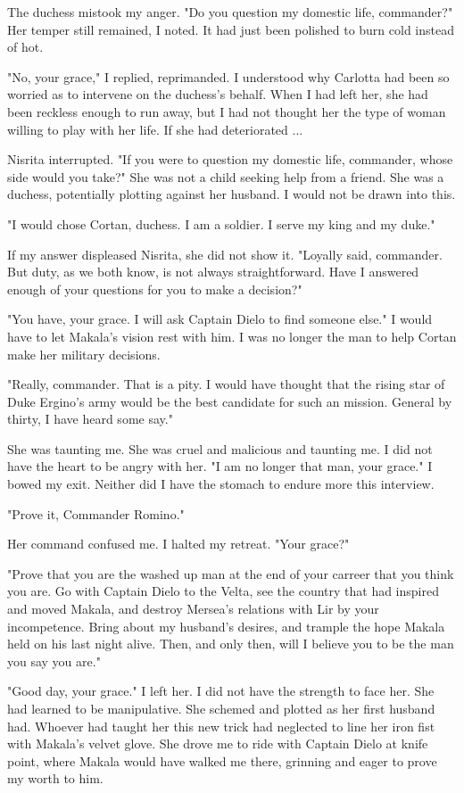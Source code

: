 \documentclass{article}
\begin{document}
The duchess mistook my anger. "Do you question my domestic life, commander?" Her temper still remained, I noted. It had just been polished to burn cold instead of hot.

"No, your grace," I replied, reprimanded. I understood why Carlotta had been so worried as to intervene on the duchess's behalf. When I had left her, she had been reckless enough to run away, but I had not thought her the type of woman willing to play with her life. If she had deteriorated ...

Nisrita interrupted. "If you were to question my domestic life, commander, whose side would you take?" She was not a child seeking help from a friend. She was a duchess, potentially plotting against her husband. I would not be drawn into this.

"I would chose Cortan, duchess. I am a soldier. I serve my king and my duke."

If my answer displeased Nisrita, she did not show it. "Loyally said, commander. But duty, as we both know, is not always straightforward. Have I answered enough of your questions for you to make a decision?"

"You have, your grace. I will ask Captain Dielo to find someone else." I would have to let Makala's vision rest with him. I was no longer the man to help Cortan make her military decisions.

"Really, commander. That is a pity. I would have thought that the rising star of Duke Ergino's army would be the best candidate for such an mission. General by thirty, I have heard some say."

She was taunting me. She was cruel and malicious and taunting me. I did not have the heart to be angry with her. "I am no longer that man, your grace." I bowed my exit. Neither did I have the stomach to endure more this interview. 

"Prove it, Commander Romino."

Her command confused me. I halted my retreat. "Your grace?"

"Prove that you are the washed up man at the end of your carreer that you think you are. Go with Captain Dielo to the Velta, see the country that had inspired and moved Makala, and destroy Mersea's relations with Lir by your incompetence. Bring about my husband's desires, and trample the hope Makala held on his last night alive. Then, and only then, will I believe you to be the man you say you are."

"Good day, your grace." I left her. I did not have the strength to face her. She had learned to be manipulative. She schemed and plotted as her first husband had. Whoever had taught her this new trick had neglected to line her iron fist with Makala's velvet glove. She drove me to ride with Captain Dielo at knife point, where Makala would have walked me there, grinning and eager to prove my worth to him. 
\end{document}
